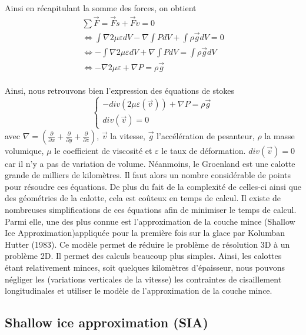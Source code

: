 \documentclass{article}
\begin{document}
Ainsi en récapitulant la somme des forces, on obtient
\begin{equation}
\begin{split}
\sum\vec{F} = \vec{F}s + \vec{F}v = 0 \\
\Leftrightarrow 
\int \nabla 2 \mu \varepsilon dV - \nabla \int P dV + \int \rho \vec{g} dV = 0 \\
\Leftrightarrow 
- \int \nabla 2 \mu \varepsilon dV + \nabla \int P dV = \int \rho \vec{g} dV  \\
\Leftrightarrow 
- \nabla 2 \mu \varepsilon + \nabla P = \rho \vec{g}
\end{split}
\end{equation}
\\
Ainsi, nous retrouvons bien l'expression des équations de stokes 
\begin{equation}
\left\{
\begin{array}{l}
-div(2 \mu \varepsilon(\vec{v})) + \nabla P = \rho \vec{g} \\
div(\vec{v}) = 0 \qquad
\end{array}
\right.
\label{eq1}
\end{equation}
avec $\nabla = ( \frac{\partial}{\partial x} + \frac{\partial}{\partial y} + \frac{\partial}{\partial z})$, $\vec{v}$ la vitesse, $\vec{g}$ l'accélération de pesanteur, $\rho$ la masse volumique, $\mu$ le coefficient de viscosité et $\varepsilon$ le taux de déformation. $div(\vec{v}) = 0$ car il n'y a pas de variation de volume.
\newpage
Néanmoins, le Groenland est une calotte grande de milliers de kilomètres. Il faut alors un nombre considérable de points pour résoudre ces équations. De plus du fait de la complexité de celles-ci ainsi que des géométries de la calotte, cela est coûteux en temps de calcul. 
Il existe de nombreuses simplifications de  ces équations afin de minimiser le temps de calcul. Parmi elle, une des plus connue est l'approximation de la couche mince (Shallow Ice Approximation)appliquée pour la première fois sur la glace par Kolumban Hutter (1983). Ce modèle permet de réduire le problème de résolution 3D à un problème 2D. Il permet des calculs beaucoup plus simples. Ainsi, les calottes étant relativement minces, soit quelques kilomètres d'épaisseur, nous pouvons négliger les (variations verticales de la vitesse) les contraintes de cisaillement longitudinales et utiliser le modèle de l'approximation de la couche mince.
\newline

\subsection{Shallow ice approximation (SIA)}
\end{document}

